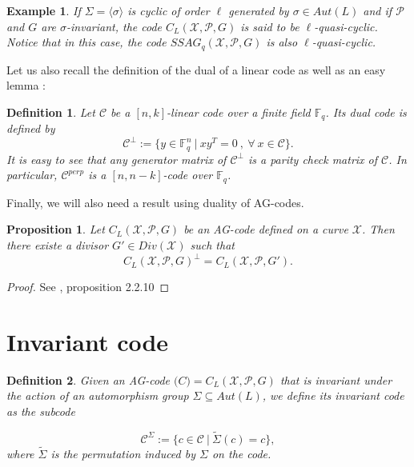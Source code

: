 \documentclass[10pt]{article}
\newtheorem{def1}{Definition}[]
\newtheorem{expl}{Example}[]
\newtheorem{prop1}{Proposition}[]
\newcommand{\s}{\vspace{0.3cm}}
\newcommand{\fq}{\mathbb{F}_q}
\newcommand{\su}{\subseteq}
\newcommand{\X}{\mathcal{X}}
\newcommand{\PR}{\mathcal{P}}
\begin{document}
\s

\begin{expl} 
\rm If $\Sigma = \langle\sigma\rangle$ is cyclic of order $\ell$ generated by $\sigma \in Aut(L)$ and if $\PR$ and $G$ are $\sigma$-invariant, the code $C_L(\X,\PR,G)$ is said to be $\ell$-quasi-cyclic. Notice that in this case, the code $SSAG_q(\X,\PR,G)$ is also $\ell$-quasi-cyclic.
\end{expl}

\s

Let us also recall the definition of the dual of a linear code as well as an easy lemma :

\s

\begin{def1}
Let $\mathcal{C}$ be a $[n,k]$-linear code over a finite field $\fq$. Its dual code is defined by 
\[\mathcal{C}^{\perp} := \{ y \in \fq^n \ | \ xy^T = 0 \ , \ \forall \ x \in \mathcal{C}\}.\]
It is easy to see that any generator matrix of $\mathcal{C}^{\perp}$ is a parity check matrix of $\mathcal{C}$. In particular, $\mathcal{C}^{perp}$ is a $[n,n-k]$-code over $\fq$.
\end{def1}

\s

Finally, we will also need a result using duality of AG-codes.

\s

\begin{prop1} \label{dual}
Let $C_L(\X,\PR,G)$ be an AG-code defined on a curve $\X$. Then there existe a divisor $G' \in Div(\X)$ such that 
\[C_L(\X,\PR,G)^{\perp} = C_L(\X,\PR,G').\]
\end{prop1}

\s

\begin{proof}
See \cite{Sti}, proposition 2.2.10
\end{proof}

\section{Invariant code}

\s

\begin{def1} Given an AG-code $\mathcal(C) = C_L(\X,\PR,G)$ that is invariant under the action of an automorphism group $\Sigma \su Aut(L)$, we define its invariant code as the subcode 

\[\mathcal{C}^{\Sigma} := \{c \in \mathcal{C} \ | \ \tilde{\Sigma}(c)=c\},\]
where $\tilde{\Sigma}$ is the permutation induced by $\Sigma$ on the code.
\end{def1}
\s
\end{document}
